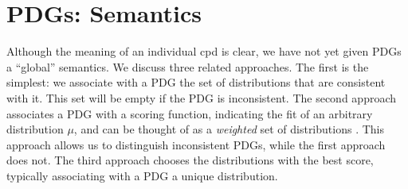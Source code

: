 \documentclass{article}
\theoremstyle{plain}
\theoremstyle{definition}
\theoremstyle{remark}
\numberwithin{equation}{section}
\begin{document}
\section{PDGs: Semantics}\label{sec:semantics}
Although the meaning of an individual cpd is clear, we have not yet given 
PDGs a ``global'' semantics. We discuss three related approaches. The first
is the 
simplest: we associate with a PDG the set of distributions that are consistent
with it. This set will be empty if the PDG is inconsistent.
%
The second approach associates a PDG with a scoring function, indicating the fit
of an arbitrary distribution $\mu$, and can be thought of as a \emph{weighted}
set of distributions \cite{HL12}. This approach allows us to distinguish
inconsistent PDGs, while the first approach does not. The third approach chooses
the distributions with the best score, typically associating with a PDG a unique
distribution.
\end{document}
